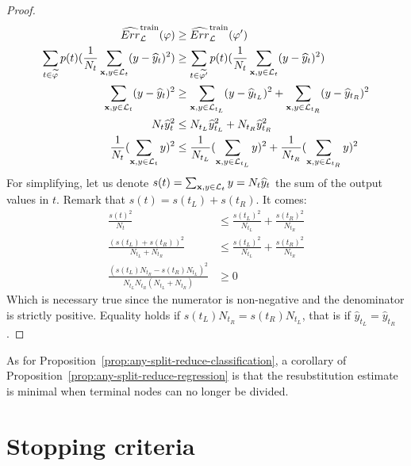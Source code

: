 \begin{proof}
\begin{align*}
\widehat{Err}_{\cal L}^\text{train}(\varphi) &\geq \widehat{Err}_{\cal L}^\text{train}(\varphi^\prime)  \\
\sum_{t \in \widetilde{\varphi}} p(t) (\frac{1}{N_t} \sum_{\mathbf{x}, y \in {\cal L}_t} (y - \widehat{y}_t)^2) &\geq \sum_{t \in \widetilde{\varphi^\prime}} p(t) (\frac{1}{N_t} \sum_{\mathbf{x}, y \in {\cal L}_t} (y - \widehat{y}_t)^2) \\
\sum_{\mathbf{x}, y \in {\cal L}_t} (y - \widehat{y}_t)^2 &\geq \sum_{\mathbf{x}, y \in {\cal L}_{t_L}} (y - \widehat{y}_{t_L})^2 + \sum_{\mathbf{x}, y \in {\cal L}_{t_R}} (y - \widehat{y}_{t_R})^2 \\
N_t \widehat{y}_t^2 &\leq N_{t_L} \widehat{y}_{t_L}^2 + N_{t_R} \widehat{y}_{t_R}^2 \\
\frac{1}{N_t} (\sum_{\mathbf{x}, y \in {\cal L}_{t}} y)^2 &\leq \frac{1}{N_{t_L}} (\sum_{\mathbf{x}, y \in {\cal L}_{t_L}} y)^2 + \frac{1}{N_{t_R}} (\sum_{\mathbf{x}, y \in {\cal L}_{t_R}} y)^2
\end{align*}
For simplifying, let us denote $s(t) = \sum_{\mathbf{x}, y \in {\cal L}_{t}} y = N_t \widehat{y}_t$
the sum of the output values in $t$. Remark that $s(t) = s(t_L) + s(t_R)$. It comes:
\begin{align*}
\frac{s(t)^2}{N_t} &\leq \frac{s(t_L)^2}{N_{t_L}} + \frac{s(t_R)^2}{N_{t_R}} \\
\frac{(s(t_L) + s(t_R))^2}{N_{t_L} + N_{t_R}} &\leq \frac{s(t_L)^2}{N_{t_L}} + \frac{s(t_R)^2}{N_{t_R}} \\
\frac{(s(t_L) N_{t_R} - s(t_R) N_{t_L})^2}{N_{t_L} N_{t_R} (N_{t_L} + N_{t_R})} &\geq 0
\end{align*}
Which is necessary true since the numerator is non-negative and the denominator is
strictly positive. Equality holds if $s(t_L) N_{t_R} = s(t_R) N_{t_L}$, that is if $\widehat{y}_{t_L} = \widehat{y}_{t_R}$.
\end{proof}

As for Proposition~\ref{prop:any-split-reduce-classification}, a corollary of Proposition~\ref{prop:any-split-reduce-regression}
is that the resubstitution estimate is minimal when terminal nodes can no longer be divided.


\section{Stopping criteria}
\label{sec:3:stop}


